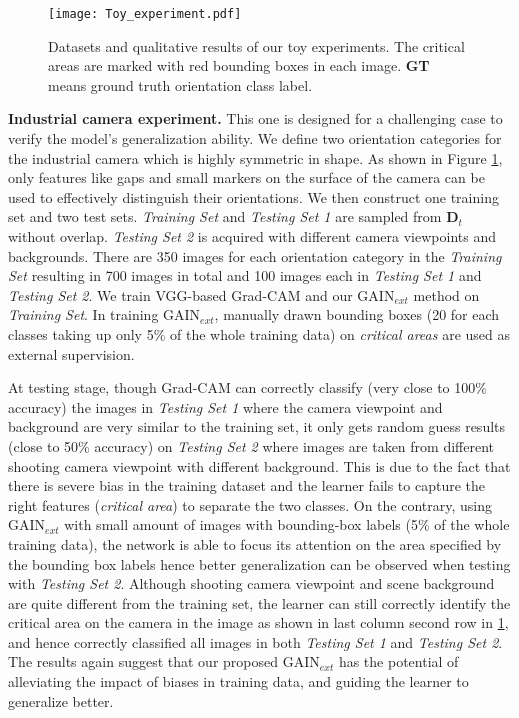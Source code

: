 \documentclass[10pt,twocolumn,letterpaper]{article}
\begin{document}
\begin{figure}%
\centering
\texttt{[image: Toy\_experiment.pdf]} %
\caption{Datasets and qualitative results of our toy experiments. The critical areas are marked with red bounding boxes in each image. \textbf{GT} means ground truth orientation class label.}
\label{fig:toy_experients}
\end{figure}



\textbf{Industrial camera experiment.} This one is designed for a challenging case to verify the model's generalization ability. We define two orientation categories for the industrial camera which is highly symmetric in shape. As shown in Figure \ref{fig:toy_experients}, only features like gaps and small markers on the surface of the camera can be used to effectively distinguish their orientations. We then construct one training set and two test sets. \textit{Training Set} and \textit{Testing Set 1} are sampled from $\textbf{D}_t$ without overlap. \textit{Testing Set 2} is acquired with different camera viewpoints and backgrounds. There are 350 images for each orientation category in the \emph{Training Set}  resulting in 700 images in total and 100 images each in \emph{Testing Set 1} and \emph{Testing Set 2}. We train VGG-based Grad-CAM and our GAIN$_{ext}$ method on \emph{Training Set}. In training GAIN$_{ext}$, manually drawn bounding boxes (20 for each classes taking up only 5\% of the whole training data) on \textit{critical areas} are used as external supervision.

At testing stage, though Grad-CAM can correctly classify (very close to 100\% accuracy) the images in \emph{Testing Set 1} where the camera viewpoint and background are very similar to the training set, it only gets random guess results (close to 50\% accuracy) on \emph{Testing Set 2} where images are taken from different shooting camera viewpoint with different background. This is due to the fact that there is severe bias in the training dataset and the learner fails to capture the right features (\textit{critical area}) to separate the two classes. On the contrary, using GAIN$_{ext}$ with small amount of images with bounding-box labels (5\% of the
whole training data), the network is able to focus its attention on the area specified by the bounding box labels hence better generalization can be observed when testing with \emph{Testing Set 2}. Although shooting camera viewpoint and scene background are quite different from the training set, the learner can still correctly identify the critical area on the camera in the image as shown in last column second row in \ref{fig:toy_experients}, and hence correctly classified all images in both \emph{Testing Set 1} and \emph{Testing Set 2}. The results again suggest that our proposed GAIN$_{ext}$ has the potential of alleviating the impact of biases in training data, and guiding the learner to generalize better.
\end{document}
